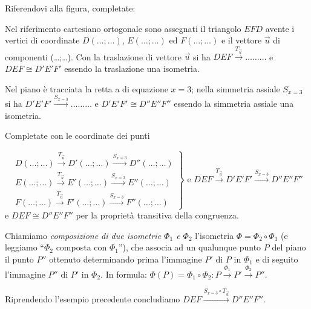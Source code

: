 \begin{exrig}
\begin{esempio}
Riferendovi alla figura, completate:
		
Nel riferimento cartesiano ortogonale sono assegnati il triangolo $EFD$ avente i vertici di coordinate $D(\ldots{};\ldots{})$, $E(\ldots{};\ldots{})$ ed $F(\ldots{};\ldots{})$ e il vettore $\vec{u}$ di componenti (\ldots{};\ldots{}). Con la traslazione di vettore $\vec{u}$ si ha $DEF \overset{T_{\vec{u}}}\rightarrow \ldots\ldots\ldots{}$ e $DEF\cong D'E'F'$ essendo la traslazione una isometria.
		
Nel piano è tracciata la retta a di equazione $x=3$; nella simmetria assiale $S_{x=3}$ si ha $D'E'F' \overset{S_{x=3}}\rightarrow \ldots\ldots\ldots{}$ e $D'E'F'\cong D''E''F''$ essendo la simmetria assiale una isometria.
		
Completate con le coordinate dei punti
		
\[\left.\begin{array}{l}D(\ldots{};\ldots{}) \overset{T_{\vec{u}}}\rightarrow D'(\ldots{};\ldots{})\overset{S_{x=3}}\rightarrow D''(\ldots{};\ldots{})\\
E(\ldots{};\ldots{}) \overset{T_{\vec{u}}}\rightarrow E'(\ldots{};\ldots{})\overset{S_{x=3}}\rightarrow E''(\ldots{};\ldots{})\\
F(\ldots{};\ldots{}) \overset{T_{\vec{u}}}\rightarrow F'(\ldots{};\ldots{})\overset{S_{x=3}}\rightarrow F''(\ldots{};\ldots{})\end{array} \right\}\text{ e } DEF\overset{T_{\vec{u}}}\rightarrow D'E'F'\overset{S_{x=3}}\rightarrow D''E''F''\]
e $DEF\cong D''E''F''$ per la proprietà transitiva della congruenza.
\end{esempio}
\end{exrig}
		
\begin{definizione}
Chiamiamo \emph{composizione di due isometrie $\Phi_1$ e $\Phi_2$} l'isometria $\Phi = \Phi_2 \circ \Phi_1$ (e leggiamo ``$\Phi_2$ composta con $\Phi_1$''), che associa ad un qualunque punto $P$ del piano il punto $P''$ ottenuto determinando prima l'immagine $P'$ di $P$ in $\Phi_1$ e di seguito l'immagine $P''$ di $P'$ in $\Phi_2$. In formula: $\Phi(P)=\Phi_1 \circ \Phi_2:P\overset{\Phi_1}\rightarrow P' \overset{\Phi_2}\rightarrow P''$.
\end{definizione}

Riprendendo l'esempio precedente concludiamo $DEF \overset{S_{x=3} \circ T_{\vec{u}}}\rightarrow D''E''F''$.
			
